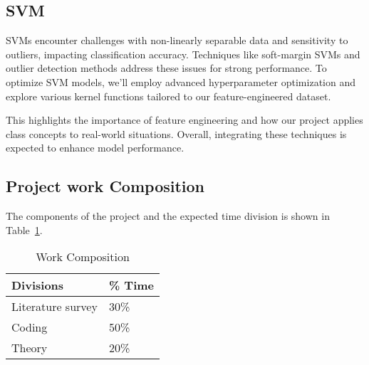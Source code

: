 \documentclass{article}
\begin{document}
\subsection{SVM}
SVMs encounter challenges with non-linearly separable data and sensitivity to outliers, impacting classification accuracy. Techniques like soft-margin SVMs and outlier detection methods address these issues for strong performance. To optimize SVM models, we'll employ advanced hyperparameter optimization and explore various kernel functions tailored to our feature-engineered dataset.


This highlights the importance of feature engineering and how our project applies class concepts to real-world situations. Overall, integrating these techniques is expected to enhance model performance.


\subsection{Project work Composition}
The components of the project and the expected time division is shown in Table~\ref{Work}.

\begin{table}[h]
  \caption{Work Composition}
  \label{Work}
  \centering
  \begin{tabular}{ll}
    \toprule
    Divisions    & \% Time \\
    \midrule
    Literature survey & 30\% \\
    Coding & 50\% \\
    Theory & 20\% \\
    \bottomrule
  \end{tabular}
\end{table}
\end{document}
